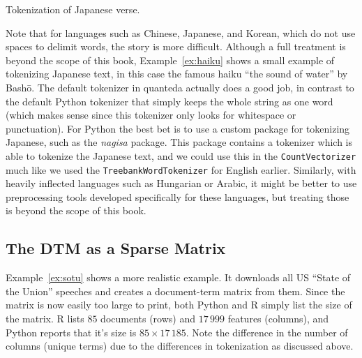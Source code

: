 \begin{ccsexample}
  \begin{tcbraster}[raster columns=2,raster equal height=rows,raster valign=top]
    \begin{tcolorbox}[title=Python Output]
        \texttt{[image: \{chapter10/haiku.py]}.png}
    \end{tcolorbox}%
    \begin{tcolorbox}[title=R Output]
        \texttt{[image: \{chapter10/haiku.r]}.png}
    \end{tcolorbox}%
  \end{tcbraster}
  \caption{Tokenization of Japanese verse.}\label{ex:haiku}
\end{ccsexample}



Note that for languages such as Chinese, Japanese, and Korean, which do not use spaces to delimit words, the story is more difficult.
Although a full treatment is beyond the scope of this book, Example~\ref{ex:haiku} shows a small example of tokenizing Japanese text,
in this case the famous haiku ``the sound of water'' by Bash\={o}.
The default tokenizer in quanteda actually does a good job, in contrast to the default Python tokenizer
that simply keeps the whole string as one word
(which makes sense since this tokenizer only looks for whitespace or punctuation).
For Python the best bet is to use a custom package for tokenizing Japanese, such as the \emph{nagisa} package.
This package contains a tokenizer which is able to tokenize the Japanese text, and we could use this in the \texttt{CountVectorizer}
much like we used the \texttt{TreebankWordTokenizer} for English earlier.
Similarly, with heavily inflected languages such as Hungarian or Arabic,
it might be better to use preprocessing tools developed specifically for these languages, but treating those is
beyond the scope of this book.


\subsection{The DTM as a Sparse Matrix}\label{sec:dtm}


Example~\ref{ex:sotu} shows a more realistic example.
It downloads all US ``State of the Union'' speeches and creates a document-term matrix from them.
Since the matrix is now easily too large to print, both Python and R simply list the size of the matrix.
R lists $85$ documents (rows) and $17\,999$ features (columns), and Python reports that it's size is $85\times17\,185$.
Note the difference in the number of columns (unique terms) due to the differences in tokenization as discussed above.

